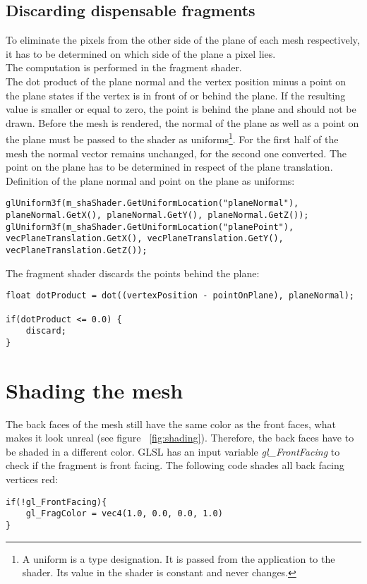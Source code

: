 \subsection{Discarding dispensable fragments}
To eliminate the pixels from the other side of the plane of each mesh respectively, it has to be determined on which side of the plane a pixel lies.\\
The computation is performed in the fragment shader.\\
The dot product of the plane normal and the vertex position minus a point on the plane states if the vertex is in front of or behind the plane. If the resulting value is smaller or equal to zero, the point is behind the plane and should not be drawn. Before the mesh is rendered, the normal of the plane as well as a point on the plane must be passed to the shader as uniforms\footnote{A uniform is a type designation. It is passed from the application to the shader. Its value in the shader is constant and never changes.}. 
For the first half of the mesh the normal vector remains unchanged, for the second one converted. The point on the plane has to be determined in respect of the plane translation.\\
\newline
Definition of the plane normal and point on the plane as uniforms:
\begin{lstlisting}
glUniform3f(m_shaShader.GetUniformLocation("planeNormal"), planeNormal.GetX(), planeNormal.GetY(), planeNormal.GetZ());
glUniform3f(m_shaShader.GetUniformLocation("planePoint"), vecPlaneTranslation.GetX(), vecPlaneTranslation.GetY(), vecPlaneTranslation.GetZ());
\end{lstlisting}

The fragment shader discards the points behind the plane:
\begin{lstlisting}
float dotProduct = dot((vertexPosition - pointOnPlane), planeNormal);
		
if(dotProduct <= 0.0) {
	discard;
}
\end{lstlisting}

\section{Shading the mesh}
The back faces of the mesh still have the same color as the front faces, what makes it look unreal (see figure ~\ref{fig:shading}). Therefore, the back faces have to be shaded in a different color. GLSL has an input variable \emph{gl\_FrontFacing} to check if the fragment is front facing. The following code shades all back facing vertices red:
\begin{lstlisting}
if(!gl_FrontFacing){
	gl_FragColor = vec4(1.0, 0.0, 0.0, 1.0)
}
\end{lstlisting}

